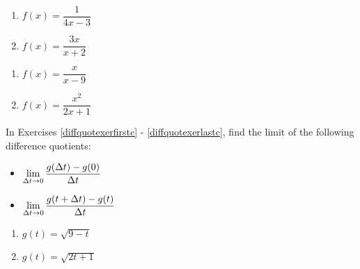 \documentclass{ximera}
\begin{document}
\begin{multicols}{2}
\begin{enumerate}

\setcounter{enumi}{\value{HW}}

\item\label{rationaltangentfirst} $f(x) = \dfrac{1}{4x-3}$ 
\item $f(x) = \dfrac{3x}{x+2}$ 

\setcounter{HW}{\value{enumi}}
\end{enumerate}
\end{multicols}

\begin{multicols}{2}
\begin{enumerate}
\setcounter{enumi}{\value{HW}}

\item $f(x) = \dfrac{x}{x - 9}$
\item\label{rationaltangentlast} $f(x) = \dfrac{x^2}{2x+1}$ 

\setcounter{HW}{\value{enumi}}
\end{enumerate}
\end{multicols}

In Exercises \ref{diffquotexerfirstc} - \ref{diffquotexerlastc},  find the limit of the following difference quotients:

\begin{multicols}{2}

\begin{itemize}

\item  $\ds{\lim_{\Delta t \rightarrow 0} \dfrac{g(\Delta t) - g(0)}{\Delta t}}$

\item  $\ds{\lim_{\Delta t \rightarrow 0} \dfrac{g(t+\Delta t) - g(t)}{\Delta t}}$

\end{itemize}

\end{multicols}


\begin{multicols}{2}
\begin{enumerate}
\setcounter{enumi}{\value{HW}}

\item  $g(t) = \sqrt{9-t}$  \label{diffquotexerfirstc}
\item  $g(t) = \sqrt{2t+1}$   \label{diffquotexerlastc}


\setcounter{HW}{\value{enumi}}
\end{enumerate}
\end{multicols}
\end{document}
